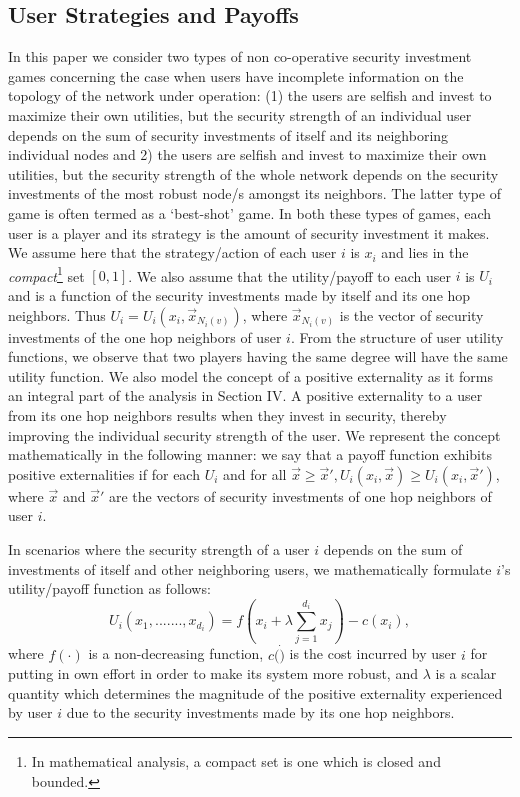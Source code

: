 \documentclass[letterpaper,12pt,onecolumn, nodraft]{IEEEtran}
\begin{document}
\subsection{User Strategies and Payoffs} \label{sec-payoff}
In this paper we consider two types of non co-operative security investment games concerning the case when users have incomplete information on the topology of the network under operation: (1) the users are selfish and invest to maximize their own utilities, but the security strength of an individual user depends on the sum of security investments of itself and its neighboring individual nodes and 2) the users are selfish and invest to maximize their own utilities, but the security strength of the whole network depends on the security investments of the most robust node/s amongst its neighbors. The latter type of game is often termed as a `best-shot' game. In both these types of games, each user is a player and its strategy is the amount of security investment it makes. We assume here that the strategy/action of each user $i$ is $x_{i}$ and lies in the \emph{compact}\footnote{In mathematical analysis, a compact set is one which is closed and bounded.} set $[0,1]$. We also assume that the utility/payoff to each user $i$ is $U_{i}$ and is a function of the security investments made by itself and its one hop neighbors. Thus $U_{i} = U_{i}(x_{i}, \overrightarrow x_{N_{i}(v)})$, where $\overrightarrow x_{N_{i}(v)}$ is the vector of security investments of the one hop neighbors of user $i$. From the structure of user utility functions, we observe that two players having the same degree will have the same utility function.  We also model the concept of a positive externality as it forms an integral part of the analysis in Section IV. A positive externality to a user from its one hop neighbors results when they invest in security, thereby improving the individual security strength of the user. We represent the concept mathematically in the following manner: we say that a payoff function exhibits positive externalities if for each $U_{i}$ and for all $\overrightarrow x \ge \overrightarrow x', U_{i}(x_{i}, \overrightarrow x) \ge U_{i}(x_{i}, \overrightarrow x')$, where $\overrightarrow x$ and $\overrightarrow x'$ are the vectors of security investments of one hop neighbors of user $i$.

In scenarios where the security strength of a user $i$ depends on the sum of investments of itself and other neighboring users, we mathematically formulate $i$'s utility/payoff function as follows:
\begin{equation}
U_{i}(x_{1},......., x_{d_{i}}) = f\left(x_{i} + \lambda\sum_{j = 1}^{d_{i}}x_{j}\right) - c(x_{i}),
\end{equation}
where $f(\cdot)$ is a non-decreasing function, $c(\dot)$ is the cost incurred by user $i$ for putting in own effort in order to make its system more robust, and $\lambda$ is a scalar quantity which determines the magnitude of the positive externality experienced by user $i$ due to the security investments made by its one hop neighbors.  
  
\end{document}
